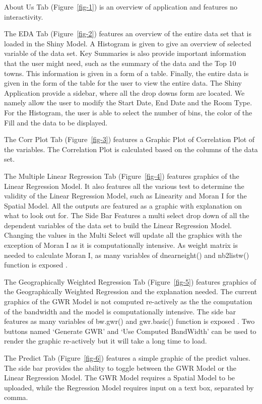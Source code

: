 \documentclass[manuscript,screen]{acmart}
\begin{document}
About Us Tab (Figure~\ref{fig-1}) is an overview of application and
features no interactivity.

The EDA Tab (Figure~\ref{fig-2}) features an overview of the entire data
set that is loaded in the Shiny Model. A Histogram is given to give an
overview of selected variable of the data set. Key Summaries is also
provide important information that the user might need, such as the
summary of the data and the Top 10 towns. This information is given in a
form of a table. Finally, the entire data is given in the form of the
table for the user to view the entire data. The Shiny Application
provide a sidebar, where all the drop downs form are located. We namely
allow the user to modify the Start Date, End Date and the Room Type. For
the Histogram, the user is able to select the number of bins, the color
of the Fill and the data to be displayed.

The Corr Plot Tab (Figure~\ref{fig-3}) features a Graphic Plot of
Correlation Plot of the variables. The Correlation Plot is calculated
based on the columns of the data set.

The Multiple Linear Regression Tab (Figure~\ref{fig-4}) features
graphics of the Linear Regression Model. It also features all the
various test to determine the validity of the Linear Regression Model,
such as Linearity and Moran I for the Spatial Model. All the outputs are
featured as a graphic with explanation on what to look out for. The Side
Bar Features a multi select drop down of all the dependent variables of
the data set to build the Linear Regression Model. Changing the values
in the Multi Select will update all the graphics with the exception of
Moran I as it is computationally intensive. As weight matrix is needed
to calculate Moran I, as many variables of dnearneight() and nb2listw()
function is exposed \citep{spdep}.

The Geographically Weighted Regression Tab (Figure~\ref{fig-5}) features
graphics of the Geographically Weighted Regression and the explanation
needed. The current graphics of the GWR Model is not computed
re-actively as the the computation of the bandwidth and the model is
computationally intensive. The side bar features as many variables of
bw.gwr() and gwr.basic() function is exposed \citep{GWmodel}. Two
buttons named `Generate GWR' and `Use Computed BandWidth' can be used to
render the graphic re-actively but it will take a long time to load.

The Predict Tab (Figure~\ref{fig-6}) features a simple graphic of the
predict values. The side bar provides the ability to toggle between the
GWR Model or the Linear Regression Model. The GWR Model requires a
Spatial Model to be uploaded, while the Regression Model requires input
on a text box, separated by comma.
\end{document}
